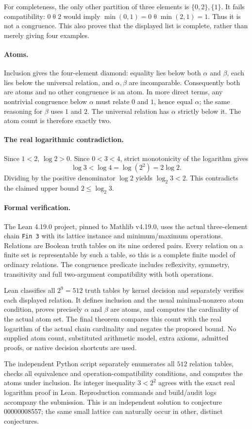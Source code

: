 \documentclass[11pt]{article}
\begin{document}
For completeness, the only other partition of three elements is $\{0,2\},\{1\}$. It fails compatibility: $0\mathrel\theta2$ would imply $\min(0,1)=0\mathrel\theta\min(2,1)=1$. Thus it is not a congruence. This also proves that the displayed list is complete, rather than merely giving four examples.

\paragraph{Atoms.} Inclusion gives the four-element diamond: equality lies below both $\alpha$ and $\beta$, each lies below the universal relation, and $\alpha,\beta$ are incomparable. Consequently both are atoms and no other congruence is an atom. In more direct terms, any nontrivial congruence below $\alpha$ must relate $0$ and $1$, hence equal $\alpha$; the same reasoning for $\beta$ uses $1$ and $2$. The universal relation has $\alpha$ strictly below it. The atom count is therefore exactly two.

\paragraph{The real logarithmic contradiction.} Since $1<2$, $\log2>0$. Since $0<3<4$, strict monotonicity of the logarithm gives
\[
\log3<\log4=\log(2^2)=2\log2.
\]
Dividing by the positive denominator $\log2$ yields $\log_2 3<2$. This contradicts the claimed upper bound $2\leq\log_2 3$.

\paragraph{Formal verification.} The Lean 4.19.0 project, pinned to Mathlib v4.19.0, uses the actual three-element chain \texttt{Fin 3} with its lattice instance and minimum/maximum operations. Relations are Boolean truth tables on its nine ordered pairs. Every relation on a finite set is representable by such a table, so this is a complete finite model of ordinary relations. The congruence predicate includes reflexivity, symmetry, transitivity and full two-argument compatibility with both operations.

Lean classifies all $2^9=512$ truth tables by kernel decision and separately verifies each displayed relation. It defines inclusion and the usual minimal-nonzero atom condition, proves precisely $\alpha$ and $\beta$ are atoms, and computes the cardinality of the actual atom set. The final theorem compares this count with the real logarithm of the actual chain cardinality and negates the proposed bound. No supplied atom count, substituted arithmetic model, extra axioms, admitted proofs, or native decision shortcuts are used.

The independent Python script separately enumerates all $512$ relation tables, checks all equivalence and operation-compatibility conditions, and computes the atoms under inclusion. Its integer inequality $3<2^2$ agrees with the exact real logarithm proof in Lean. Reproduction commands and build/audit logs accompany the submission. This is an independent solution to conjecture 00000008557; the same small lattice can naturally occur in other, distinct conjectures.
\end{document}
